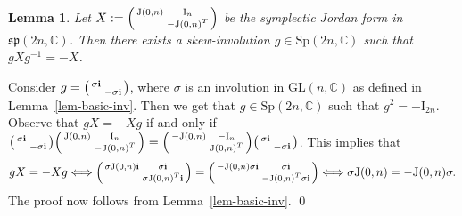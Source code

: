 \documentclass[11pt,reqno]{amsart}
\renewenvironment{proof}{{\bfseries Proof.}}{\qed}
\numberwithin{equation}{section}
\newtheorem{lemma}[theorem]{Lemma}
\theoremstyle{definition}
\def\C{\mathbb C}
\def\ib{\mathbf {i}}
\def\C{\mathbb {C}}
\def\ib{\mathbf {i}}
\newcommand{\lemref}[1]{Lemma~\ref{#1}}
\begin{document}
\begin{lemma}\label{lem-real-nil-skew-construct}
	Let $X:=  \begin{psmallmatrix}
		\mathrm{J}(0,n) & \mathrm{I}_{n} \\
		& - \mathrm{J}(0,n)^{T}
	\end{psmallmatrix}$ be the symplectic Jordan form in $\mathfrak{sp}(2n,\mathbb{C})$. Then there exists a skew-involution $g\in \mathrm{Sp}(2n,\mathbb{C})$ such that $gXg^{-1}=-X$.
\end{lemma}
\begin{proof}
	Consider $g=  \begin{psmallmatrix}
		\sigma \ib & \\
		& - \sigma \ib
	\end{psmallmatrix}$, where $\sigma $ is an involution in $\mathrm{GL}(n,\C)$ as defined in \lemref{lem-basic-inv}. Then we get that  $g \in \mathrm{Sp}(2n,\mathbb{C})$ such that $ g^2= -\mathrm{I}_{2n}$. Observe  that $gX =-Xg$ if and only if $  \begin{psmallmatrix}
		\sigma \ib & \\
		& - \sigma \ib
	\end{psmallmatrix} \begin{psmallmatrix}
		\mathrm{J}(0,n) & \mathrm{I}_{n} \\
		& - \mathrm{J}(0,n)^{T}
	\end{psmallmatrix} =   \begin{psmallmatrix}
		-	\mathrm{J}(0,n) & -\mathrm{I}_{n} \\
		&  \mathrm{J}(0,n)^{T}
	\end{psmallmatrix}  \begin{psmallmatrix}
		\sigma \ib & \\
		& - \sigma \ib
	\end{psmallmatrix}$. This implies that 
	\begin{equation*}
		gX =-Xg	\Longleftrightarrow 	\begin{psmallmatrix}
			\sigma	\mathrm{J}(0,n) \ib & 	\sigma \ib \\
			& 	\sigma \mathrm{J}(0,n)^{T} \ib
		\end{psmallmatrix} =   \begin{psmallmatrix}
			-	\mathrm{J}(0,n) 	\sigma \ib & 	\sigma \ib\\
			&  -\mathrm{J}(0,n)^{T} 	\sigma \ib
		\end{psmallmatrix}  \Longleftrightarrow \sigma	\mathrm{J}(0,n) = -	\mathrm{J}(0,n)	\sigma.
	\end{equation*}
	The proof now follows from \lemref{lem-basic-inv}.
\end{proof}
\end{document}
